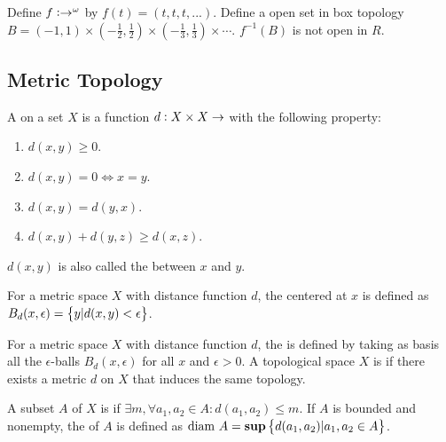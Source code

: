 \begin{example}
    Define $f: \real \rightarrow \real^{\omega}$ by $f(t) = (t,t,t, ...)$. Define a open set in box topology $B = (-1, 1) \times (- \frac{1}{2}, \frac{1}{2}) \times  (- \frac{1}{3}, \frac{1}{3}) \times \cdots$. $f^{-1}(B)$ is not open in $R$.
\end{example}

\subsection{Metric Topology}

\begin{definition}
    A  on a set $X$ is a function $d: X \times X \rightarrow \real$ with the following property:
    \begin{enumerate}
        \item $d(x,y) \geq 0$.
        \item $d(x,y) = 0 \Leftrightarrow x = y$.
        \item $d(x,y) = d(y,x)$.
        \item $d(x,y) + d(y,z) \geq d(x,z)$.
    \end{enumerate}
    $d(x,y)$ is also called the  between $x$ and $y$.
\end{definition}

\begin{definition}
    For a metric space $X$ with distance function $d$, the  centered at $x$ is defined as $B_d(x, \epsilon) = \set{y | d(x,y) < \epsilon}$.
\end{definition}

\begin{definition}
    For a metric space $X$ with distance function $d$, the  is defined by taking as basis all the $\epsilon$-balls $B_d(x,\epsilon)$ for all $x$ and $\epsilon > 0$. A topological space $X$ is  if there exists a metric $d$ on $X$ that induces the same topology.
\end{definition}

\begin{definition}
    A subset $A$ of $X$ is  if $\exists m, \forall a_1, a_2 \in A: d(a_1, a_2) \leq m$. If $A$ is bounded and nonempty, the  of $A$ is defined as $\text{diam } A = \mathbf{sup} \set{d(a_1, a_2)| a_1, a_2 \in A} $.
\end{definition}

